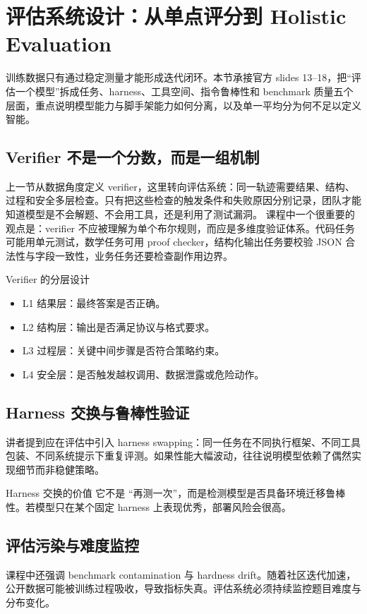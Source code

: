 \section{评估系统设计：从单点评分到 Holistic Evaluation}

训练数据只有通过稳定测量才能形成迭代闭环。本节承接官方 slides 13--18，把“评估一个模型”拆成任务、harness、工具空间、指令鲁棒性和 benchmark 质量五个层面，重点说明模型能力与脚手架能力如何分离，以及单一平均分为何不足以定义智能。

\subsection{Verifier 不是一个分数，而是一组机制}
上一节从数据角度定义 verifier，这里转向评估系统：同一轨迹需要结果、结构、过程和安全多层检查。只有把这些检查的触发条件和失败原因分别记录，团队才能知道模型是不会解题、不会用工具，还是利用了测试漏洞。
课程中一个很重要的观点是：verifier 不应被理解为单个布尔规则，而应是多维度验证体系。代码任务可能用单元测试，数学任务可用 proof checker，结构化输出任务要校验 JSON 合法性与字段一致性，业务任务还要检查副作用边界。

\begin{knowledgebox}{Verifier 的分层设计}
\begin{itemize}
    \item L1 结果层：最终答案是否正确。
    \item L2 结构层：输出是否满足协议与格式要求。
    \item L3 过程层：关键中间步骤是否符合策略约束。
    \item L4 安全层：是否触发越权调用、数据泄露或危险动作。
\end{itemize}
\end{knowledgebox}

\subsection{Harness 交换与鲁棒性验证}
讲者提到应在评估中引入 harness swapping：同一任务在不同执行框架、不同工具包装、不同系统提示下重复评测。如果性能大幅波动，往往说明模型依赖了偶然实现细节而非稳健策略。

\begin{importantbox}{Harness 交换的价值}
它不是 ``再测一次''，而是检测模型是否具备环境迁移鲁棒性。若模型只在某个固定 harness 上表现优秀，部署风险会很高。
\end{importantbox}

\subsection{评估污染与难度监控}
课程中还强调 benchmark contamination 与 hardness drift。随着社区迭代加速，公开数据可能被训练过程吸收，导致指标失真。评估系统必须持续监控题目难度与分布变化。

